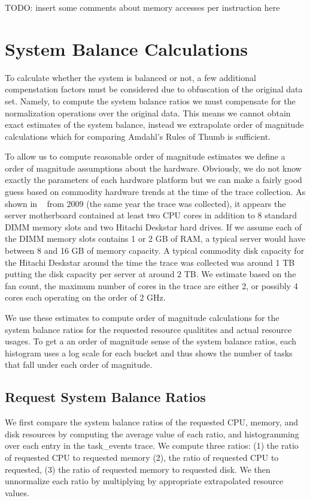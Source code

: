 \documentclass{sig-alternate}
\begin{document}
TODO: insert some comments about memory accesses per instruction here

\section{System Balance Calculations}

To calculate whether the system is balanced or not, a few additional compenstation factors must be considered due to obfuscation of the original data set.
Namely, to compute the system balance ratios we must compensate for the normalization operations over the original data.
This means we cannot obtain exact estimates of the system balance, instead we extrapolate order of magnitude calculations which for comparing Amdahl's Rules of Thumb is sufficient.

To allow us to compute reasonable order of magnitude estimates we define a order of magnitude assumptions about the hardware.
Obviously, we do not know exactly the parameters of each hardware platform but we can make a fairly good guess based on commodity hardware trends at the time of the trace collection.
As shown in ~\cite{googlehw} from 2009 (the same year the trace was collected), it appears the server motherboard contained at least two CPU cores in addition to 8 standard DIMM memory slots and two Hitachi Deskstar hard drives.
If we assume each of the DIMM memory slots contains 1 or 2 GB of RAM, a typical server would have between 8 and 16 GB of memory capacity.
A typical commodity disk capacity for the Hitachi Deskstar around the time the trace was collected was around 1 TB putting the disk capacity per server at around 2 TB.
We estimate based on the fan count, the maximum number of cores in the trace are either 2, or possibly 4 cores each operating on the order of 2 GHz.

We use these estimates to compute order of magnitude calculations for the system balance ratios for the requested resource qualitites and actual resource usages.
To get a an order of magnitude sense of the system balance ratios, each histogram uses a log scale for each bucket and thus shows the number of tasks that fall under each order of magnitude.

\subsection{Request System Balance Ratios}

We first compare the system balance ratios of the requested CPU, memory, and disk resources by computing the average value of each ratio, and histogramming over each entry in the task\_events trace.
We compute three ratios: (1) the ratio of requested CPU to requested memory (2), the ratio of requested CPU to requested, (3) the ratio of requested memory to requested disk.
We then unnormalize each ratio by multiplying by appropriate extrapolated resource values.
\end{document}
